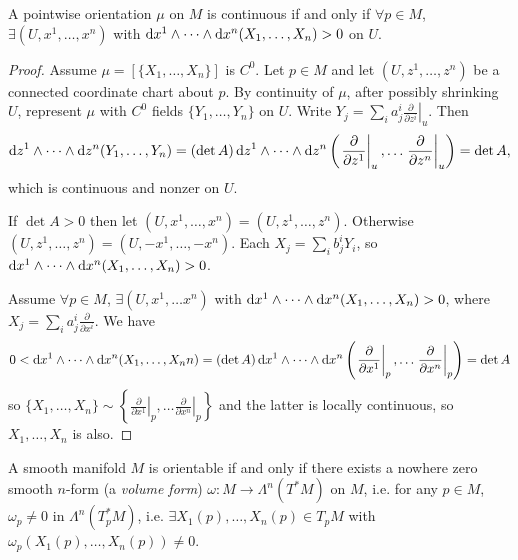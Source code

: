 \begin{lemma}
A pointwise orientation $\mu$ on $M$ is continuous if and only if
$\forall p \in M$, $\exists (U, x^1, \dots, x^n)$ with
$\mathop{}\!\mathrm{d} x^1 \wedge \cdots \wedge \mathop{}\!\mathrm{d} x^n(X_1, \dots, X_n) > 0$ on $U$.
\end{lemma}
\begin{proof}
Assume $\mu = [\{X_1, \dots, X_n\}]$ is $C^0$. Let $p \in M$ and let
$(U, z^1, \dots, z^n)$ be a connected coordinate chart about $p$. By
continuity of $\mu$, after possibly shrinking $U$, represent $\mu$
with $C^0$ fields $\{Y_1, \dots, Y_n\}$ on $U$. Write
$ Y_j
= \sum_i a^i_j
    \left.
      \frac{\partial}{\partial z^i}
    \right|_u.
$
Then
$$
  \mathop{}\!\mathrm{d} z^1 \wedge \cdots \wedge \mathop{}\!\mathrm{d} z^n (Y_1, \dots, Y_n)
= (\det A) \mathop{}\!\mathrm{d} z^1 \wedge \cdots \wedge \mathop{}\!\mathrm{d} z^n
    \left(
      \left.
        \frac{\partial}{\partial z^1}
      \right|_u,
      \dots
      \left.
        \frac{\partial}{\partial z^n}
      \right|_u
    \right)
= \det A,
$$
which is continuous and nonzer on $U$.

If $\det A > 0$ then let $(U, x^1, \dots, x^n) = (U, z^1, \dots,
z^n)$. Otherwise $(U, z^1, \dots, z^n) = (U, -x^1, \dots, -x^n)$. Each
$X_j = \sum_i b^i_j Y_i$, so $\mathop{}\!\mathrm{d} x^1 \wedge \cdots \wedge \mathop{}\!\mathrm{d}
x^n(X_1, \dots, X_n) > 0$.

Assume $\forall p \in M$, $\exists (U, x^1, \dots x^n)$ with
$\mathop{}\!\mathrm{d} x^1 \wedge \cdots \wedge \mathop{}\!\mathrm{d} x^n(X_1, \dots, X_n) > 0$, where
$X_j = \sum_i a^i_j \frac{\partial}{\partial x^i}$. We have
$$
  0
< \mathop{}\!\mathrm{d} x^1 \wedge \cdots \wedge \mathop{}\!\mathrm{d} x^n(X_1, \dots, X_nn)
= (\det A)
  \mathop{}\!\mathrm{d} x^1 \wedge \cdots \wedge \mathop{}\!\mathrm{d} x^n
    \left(
      \left.
        \frac{\partial}{\partial x^1}
      \right|_p,
      \dots
      \left.
        \frac{\partial}{\partial x^n}
      \right|_p
    \right)
= \det A
$$
so
$
     \{X_1, \dots, X_n\}
\sim \left\{
      \left.
        \frac{\partial}{\partial x^1}
      \right|_p,
      \dots
      \left.
        \frac{\partial}{\partial x^n}
      \right|_p
    \right\}
$
and the latter is locally continuous, so $X_1, \dots, X_n$ is also.
\end{proof}

\begin{theorem}
A smooth manifold $M$ is orientable if and only if there exists a
nowhere zero smooth $n$-form (a \emph{volume form})
$\omega : M \to \Lambda^n(T^\ast M)$ on $M$, i.e. for any
$p \in M$, $\omega_p \neq 0$ in $\Lambda^n(T_p^\ast M)$, i.e.
$\exists X_1(p), \dots, X_n(p) \in T_p M$ with
$\omega_p(X_1(p), \dots, X_n(p)) \neq 0$.
\end{theorem}


